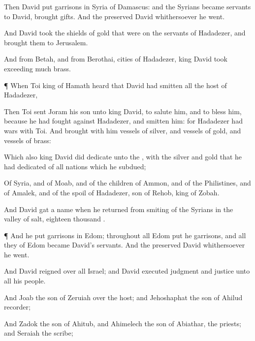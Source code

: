 {Then
David
put
garrisons in
Syria of
Damascus: and the
Syrians became
servants to
David,
{}
brought
gifts. And the
{}
preserved
David whithersoever he
went.

And
David
took the
shields of
gold that were on the
servants of
Hadadezer, and
brought them to
Jerusalem.

And from
Betah, and from
Berothai,
cities of
Hadadezer,
king
David
took
exceeding
much
brass.


\par }{\PP {}¶ When
Toi
king of
Hamath
heard that
David had
smitten all the
host of
Hadadezer,

Then
Toi
sent
Joram his
son unto
king
David, to
salute him, and to
bless him, because he had
fought against
Hadadezer, and
smitten him: for
Hadadezer had
wars with
Toi. And
{} brought with
him
vessels of
silver, and
vessels of
gold, and
vessels of
brass:

Which also
king
David did
dedicate unto the
{}, with the
silver and
gold that he had
dedicated of all
nations which he
subdued;

Of
Syria, and of
Moab, and of the
children of
Ammon, and of the
Philistines, and of
Amalek, and of the
spoil of
Hadadezer,
son of
Rehob,
king of
Zobah.

And
David
gat
{} a
name when he
returned from
smiting of the
Syrians in the
valley of
salt,
{}
eighteen
thousand
{}.


\par }{\PP {}¶ And he
put
garrisons in
Edom; throughout all
Edom
put he
garrisons, and all they of
Edom became
David’s
servants. And the
{}
preserved
David whithersoever he
went.


\par }{\PP {}And
David
reigned over all
Israel; and
David
executed
judgment and
justice unto all his
people.

And
Joab the
son of
Zeruiah
{} over the
host; and
Jehoshaphat the
son of
Ahilud
{}
recorder;

And
Zadok the
son of
Ahitub, and
Ahimelech the
son of
Abiathar,
{} the
priests; and
Seraiah
{} the
scribe;

}
